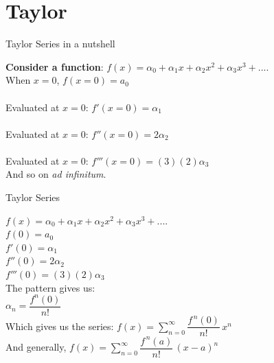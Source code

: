 \documentclass[10pt,sans,english,compress,xcolor=dvipsnames]{beamer}
\begin{document}
\section{Taylor}
\begin{frame}{Taylor Series in a nutshell}
\footnotesize

\textbf{Consider a function}: $f(x) = \alpha_0 + \alpha_1 x +\alpha_2 x^2 + \alpha_3 x^3 + ....$\\[1ex]

When $x=0$, $f(x=0) = a_0$\\[1ex]
 
\\[1ex]
Evaluated at $x=0$: $f'(x=0) = \alpha_1$\\[2ex]

\\[1ex]
Evaluated at $x=0$: $f''(x=0) = 2 \alpha_2$\\[2ex]

\\[1ex]
Evaluated at $x=0$: $f'''(x=0) = (3)(2) \alpha_3$\\[2ex]

And so on \textit{ad infinitum}.
\end{frame}


\begin{frame}{Taylor Series}
\footnotesize

$f(x) = \alpha_0 + \alpha_1 x +\alpha_2 x^2 + \alpha_3 x^3 + ....$\\[1ex]
$f(0) = a_0$\\[1ex]
$f'(0) = \alpha_1$\\[1ex]
$f''(0) = 2 \alpha_2$\\[1ex]
$f'''(0) = (3)(2) \alpha_3$\\[1ex]
The pattern gives us:\\[1ex]
$\alpha_n = \dfrac{f^n(0)}{n!}$ \\[1ex]
Which gives us the series: $f(x) = \sum\limits_{n=0}^\infty \dfrac{f^{\,n}(0)}{n!}   \,x^n $\\[1ex]
And generally, $f(x) = \sum\limits_{n=0}^\infty \dfrac{f^{\,n}(a)}{n!}   \,(x-a)^n $\\[1ex]


\end{frame}
\end{document}
